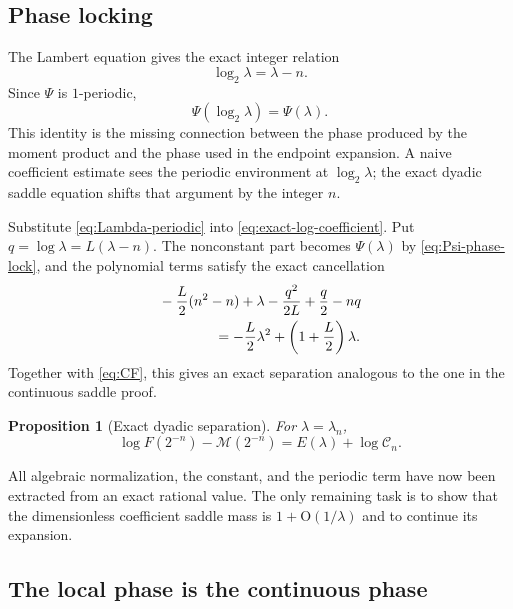 \documentclass[11pt,oneside]{article}
\newtheorem{proposition}[theorem]{Proposition}
\theoremstyle{definition}
\theoremstyle{remark}
\newcommand{\bigO}{\mathrm O}
\newcommand{\Mmain}{\mathcal M}
\newcommand{\CoeffMass}{\mathcal C}
\begin{document}
\subsection{Phase locking}
\label{subsec:phase-locking}

The Lambert equation gives the exact integer relation
\begin{equation}
 \log_2\lambda=\lambda-n.
\label{eq:phase-lock}
\end{equation}
Since $\Psi$ is $1$-periodic,
\begin{equation}
 \boxed{\Psi(\log_2\lambda)=\Psi(\lambda).}
\label{eq:Psi-phase-lock}
\end{equation}
This identity is the missing connection between the phase produced by the moment product and the phase used in the endpoint expansion.  A naive coefficient estimate sees the periodic environment at $\log_2\lambda$; the exact dyadic saddle equation shifts that argument by the integer $n$.

Substitute \eqref{eq:Lambda-periodic} into \eqref{eq:exact-log-coefficient}.  Put
$q=\log\lambda=L(\lambda-n)$.  The nonconstant part becomes $\Psi(\lambda)$ by \eqref{eq:Psi-phase-lock}, and the polynomial terms satisfy the exact cancellation
\begin{align}
 &-\frac L2(n^2-n)+\lambda-
 \frac{q^2}{2L}+\frac q2-nq                         \notag\\
 &\hspace{4em}=-\frac L2\lambda^2+
 \left(1+\frac L2\right)\lambda.
\label{eq:key-algebra-cancellation}
\end{align}
Together with \eqref{eq:CF}, this gives an exact separation analogous to the one in the continuous saddle proof.

\begin{proposition}[Exact dyadic separation]
\label{prop:exact-dyadic-separation}
For $\lambda=\lambda_n$,
\begin{equation}
 \boxed{
 \log F(2^{-n})-\Mmain(2^{-n})
 =E(\lambda)+\log\CoeffMass_n.}
\label{eq:exact-dyadic-separation}
\end{equation}
\end{proposition}

All algebraic normalization, the constant, and the periodic term have now been extracted from an exact rational value.  The only remaining task is to show that the dimensionless coefficient saddle mass is $1+\bigO(1/\lambda)$ and to continue its expansion.

\subsection{The local phase is the continuous phase}
\label{subsec:phase-identity}
\end{document}
